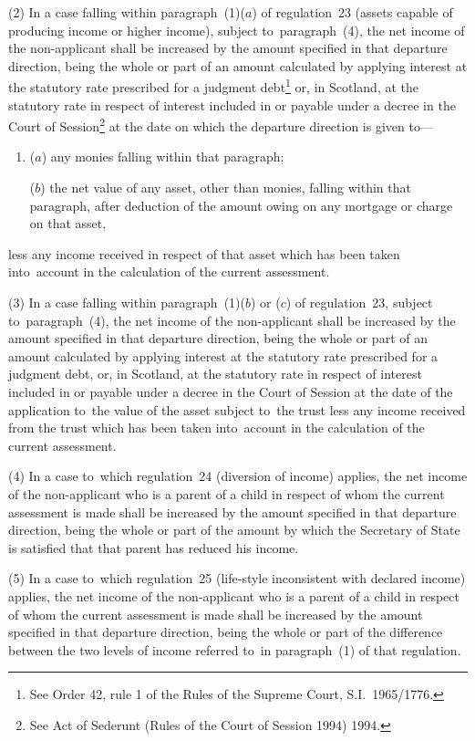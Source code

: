 \documentclass[12pt,a4paper]{article}
\begin{document}
(2) In a case falling within paragraph~(1)($a$) of regulation~23 (assets capable of producing income or higher income), subject to~paragraph~(4), the net income of the non-applicant shall be increased by 
the amount specified in that departure direction, being the whole or part of  %
an amount calculated by applying interest at the statutory rate prescribed for a judgment debt\footnote{\frenchspacing See Order 42, rule 1 of the Rules of the Supreme Court, S.I.~1965/1776.} or, in Scotland, at the statutory rate in respect of interest included in or payable under a decree in the Court of Session\footnote{\frenchspacing See Act of Sederunt (Rules of the Court of Session 1994) 1994.} at the date on which the departure direction is given to—
\begin{enumerate}\item[]
($a$) any monies falling within that paragraph;

($b$) the net value of any asset, other than monies, falling within that paragraph, after deduction of the amount owing on any mortgage or charge on that asset,
\end{enumerate}
less any income received in respect of that asset which has been taken into~account in the calculation of the current assessment.

(3) In a case falling within paragraph~(1)($b$) or ($c$) of regulation~23, subject to~paragraph~(4), the net income of the non-applicant shall be increased by 
the amount specified in that departure direction, being the whole or part of  %
an amount calculated by applying interest at the statutory rate prescribed for a judgment debt, or, in Scotland, at the statutory rate in respect of interest included in or payable under a decree in the Court of Session at the date of the application to~the value of the asset subject to~the trust less any income received from the trust which has been taken into~account in the calculation of the current assessment.

(4) In a case to~which regulation~24 (diversion of income) applies, the net income of the non-applicant who is a parent of a child in respect of whom the current assessment is made shall be increased by 
the amount specified in that departure direction, being the whole or part of  %
the amount by which the Secretary of State is satisfied that that parent has reduced his income.

(5) In a case to~which regulation~25 (life-style inconsistent with declared income) applies, the net income of the non-applicant who is a parent of a child in respect of whom the current assessment is made shall be increased by 
the amount specified in that departure direction, being the whole or part of  %
the difference between the two levels of income referred to~in paragraph~(1) of that regulation.
\end{document}
